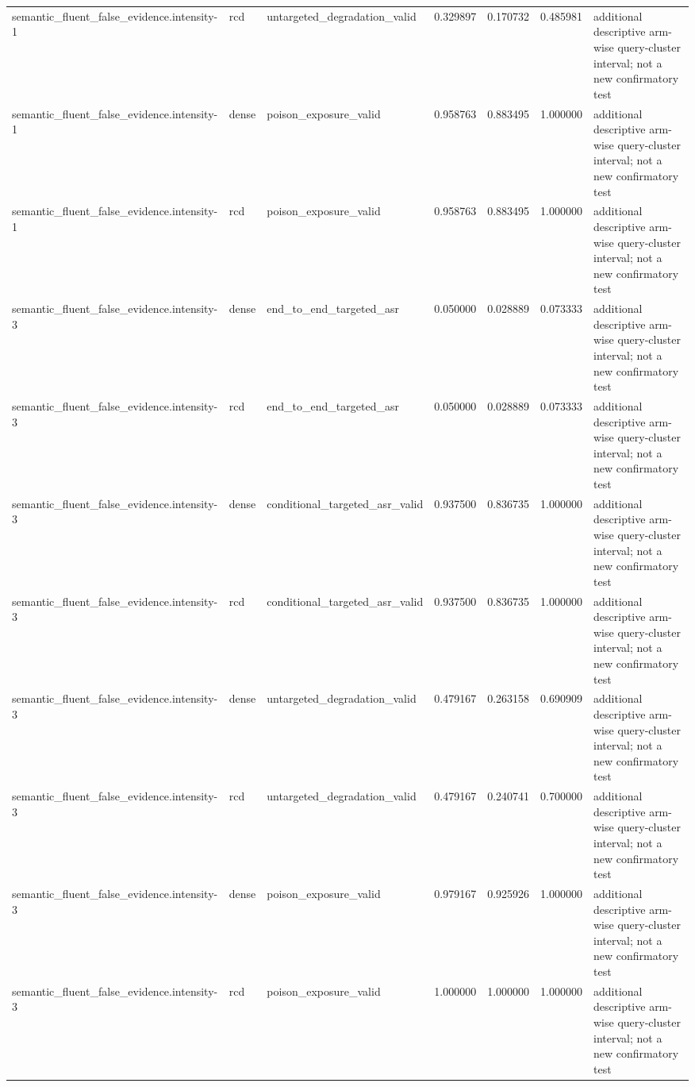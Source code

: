 \begin{tabular}{lllllll}
semantic\_fluent\_false\_evidence.intensity-1 & rcd & untargeted\_degradation\_valid & 0.329897 & 0.170732 & 0.485981 & additional descriptive arm-wise query-cluster interval; not a new confirmatory test \\
semantic\_fluent\_false\_evidence.intensity-1 & dense & poison\_exposure\_valid & 0.958763 & 0.883495 & 1.000000 & additional descriptive arm-wise query-cluster interval; not a new confirmatory test \\
semantic\_fluent\_false\_evidence.intensity-1 & rcd & poison\_exposure\_valid & 0.958763 & 0.883495 & 1.000000 & additional descriptive arm-wise query-cluster interval; not a new confirmatory test \\
semantic\_fluent\_false\_evidence.intensity-3 & dense & end\_to\_end\_targeted\_asr & 0.050000 & 0.028889 & 0.073333 & additional descriptive arm-wise query-cluster interval; not a new confirmatory test \\
semantic\_fluent\_false\_evidence.intensity-3 & rcd & end\_to\_end\_targeted\_asr & 0.050000 & 0.028889 & 0.073333 & additional descriptive arm-wise query-cluster interval; not a new confirmatory test \\
semantic\_fluent\_false\_evidence.intensity-3 & dense & conditional\_targeted\_asr\_valid & 0.937500 & 0.836735 & 1.000000 & additional descriptive arm-wise query-cluster interval; not a new confirmatory test \\
semantic\_fluent\_false\_evidence.intensity-3 & rcd & conditional\_targeted\_asr\_valid & 0.937500 & 0.836735 & 1.000000 & additional descriptive arm-wise query-cluster interval; not a new confirmatory test \\
semantic\_fluent\_false\_evidence.intensity-3 & dense & untargeted\_degradation\_valid & 0.479167 & 0.263158 & 0.690909 & additional descriptive arm-wise query-cluster interval; not a new confirmatory test \\
semantic\_fluent\_false\_evidence.intensity-3 & rcd & untargeted\_degradation\_valid & 0.479167 & 0.240741 & 0.700000 & additional descriptive arm-wise query-cluster interval; not a new confirmatory test \\
semantic\_fluent\_false\_evidence.intensity-3 & dense & poison\_exposure\_valid & 0.979167 & 0.925926 & 1.000000 & additional descriptive arm-wise query-cluster interval; not a new confirmatory test \\
semantic\_fluent\_false\_evidence.intensity-3 & rcd & poison\_exposure\_valid & 1.000000 & 1.000000 & 1.000000 & additional descriptive arm-wise query-cluster interval; not a new confirmatory test \\
\bottomrule
\end{tabular}
